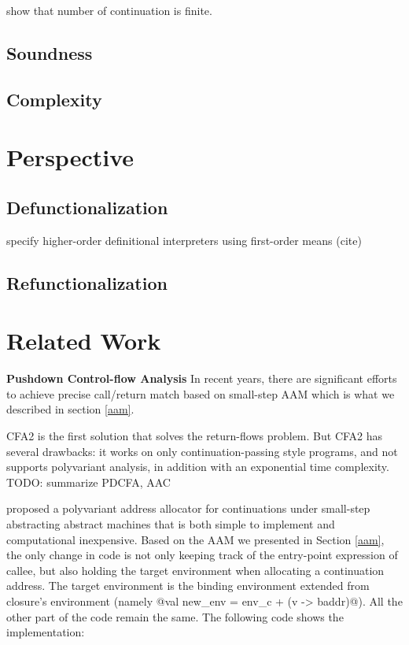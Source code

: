 \documentclass[acmsmall,review,anonymous]{acmart}\settopmatter{printfolios=true,printccs=false,printacmref=false}
\begin{document}
show that number of continuation is finite.

\subsection{Soundness}

\subsection{Complexity}

\section{Perspective}

\subsection{Defunctionalization}

specify higher-order definitional interpreters using first-order means (cite)

\subsection{Refunctionalization}


\section{Related Work}

\textbf{Pushdown Control-flow Analysis}
In recent years, there are significant efforts \cite{vardoulakis2010cfa2, earl2012introspective, 
gilray2016pushdown, johnson2015abstracting} to achieve precise call/return 
match based on small-step AAM which is what we described in section \ref{aam}.

CFA2 is the first solution that solves the return-flows problem\cite{vardoulakis2010cfa2}.
But CFA2 has several drawbacks: it works on only continuation-passing style programs, 
and not supports polyvariant analysis, in addition with an exponential time complexity.
TODO: summarize PDCFA, AAC

\citeauthor{gilray2016pushdown} proposed a polyvariant address allocator for continuations
under small-step abstracting abstract machines that is both simple to implement and
computational inexpensive. 
Based on the AAM we presented in Section \ref{aam}, the only change in code is
not only keeping track of the entry-point expression of callee, but also holding the target environment
when allocating a continuation address.
The target environment is the binding environment extended from closure's environment
(namely @val new_env = env_c + (v -> baddr)@). All the other part of the code remain the same.
The following code shows the implementation:
\end{document}
